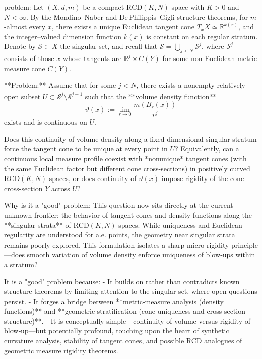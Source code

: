 problem:  
Let \((X,d,m)\) be a compact \(\mathrm{RCD}(K,N)\) space with \(K>0\) and \(N<\infty\). By the Mondino–Naber and De Philippis–Gigli structure theorems, for \(m\)-almost every \(x\), there exists a unique Euclidean tangent cone \(T_xX \simeq \mathbb{R}^{k(x)}\), and the integer–valued dimension function \(k(x)\) is constant on each regular stratum.  
Denote by \(\mathcal{S}\subset X\) the singular set, and recall that \(\mathcal{S} = \bigcup_{j<N} \mathcal{S}^j\), where \(\mathcal{S}^j\) consists of those \(x\) whose tangents are \(\mathbb{R}^j\times C(Y)\) for some non‑Euclidean metric measure cone \(C(Y)\).  

**Problem:**  
Assume that for some \(j<N\), there exists a nonempty relatively open subset \(U\subset \overline{\mathcal{S}^j}\setminus\mathcal{S}^{j-1}\) such that the **volume density function**
\[
\vartheta(x) := \lim_{r\to 0}\frac{m(B_r(x))}{r^j}
\]
exists and is continuous on \(U\).  

Does this continuity of volume density along a fixed-dimensional singular stratum force the tangent cone to be unique at every point in \(U\)?  
Equivalently, can a continuous local measure profile coexist with *nonunique* tangent cones (with the same Euclidean factor but different cone cross-sections) in positively curved \(\mathrm{RCD}(K,N)\) spaces, or does continuity of \(\vartheta(x)\) impose rigidity of the cone cross-section \(Y\) across \(U\)?

Why is it a "good" problem:  
This question now sits directly at the current unknown frontier: the behavior of tangent cones and density functions along the **singular strata** of \(\mathrm{RCD}(K,N)\) spaces.  
While uniqueness and Euclidean regularity are understood for a.e. points, the geometry near singular strata remains poorly explored. This formulation isolates a sharp micro‑rigidity principle—does smooth variation of volume density enforce uniqueness of blow‑ups within a stratum?  

It is a "good" problem because:  
- It builds on rather than contradicts known structure theorems by limiting attention to the singular set, where open questions persist.  
- It forges a bridge between **metric‑measure analysis (density functions)** and **geometric stratification (cone uniqueness and cross‑section structure)**.  
- It is conceptually simple—continuity of volume versus rigidity of blow‑up—but potentially profound, touching upon the heart of synthetic curvature analysis, stability of tangent cones, and possible RCD analogues of geometric measure rigidity theorems.